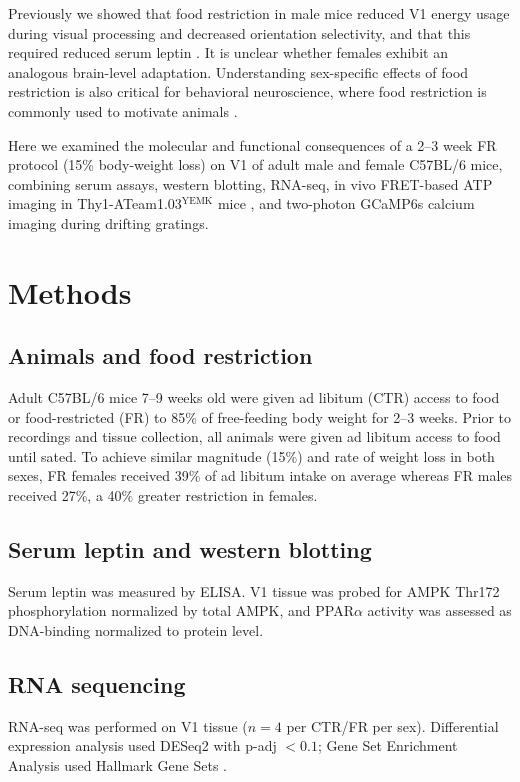 \documentclass[11pt]{article}
\begin{document}
Previously we showed that food restriction in male mice reduced V1 energy usage during visual processing and decreased orientation selectivity, and that this required reduced serum leptin \cite{padamsey2022neocortex}. It is unclear whether females exhibit an analogous brain-level adaptation. Understanding sex-specific effects of food restriction is also critical for behavioral neuroscience, where food restriction is commonly used to motivate animals \cite{hori1990comparative,toth2000animal,guo2014procedures}.

Here we examined the molecular and functional consequences of a 2--3 week FR protocol (15\% body-weight loss) on V1 of adult male and female C57BL/6 mice, combining serum assays, western blotting, RNA-seq, in vivo FRET-based ATP imaging in Thy1-ATeam1.03$^{\mathrm{YEMK}}$ mice \cite{imamura2009visualization,yoshida2019development}, and two-photon GCaMP6s calcium imaging during drifting gratings.

\section{Methods}
\subsection{Animals and food restriction}
Adult C57BL/6 mice 7--9 weeks old were given ad libitum (CTR) access to food or food-restricted (FR) to 85\% of free-feeding body weight for 2--3 weeks. Prior to recordings and tissue collection, all animals were given ad libitum access to food until sated. To achieve similar magnitude (15\%) and rate of weight loss in both sexes, FR females received 39\% of ad libitum intake on average whereas FR males received 27\%, a 40\% greater restriction in females.

\subsection{Serum leptin and western blotting}
Serum leptin was measured by ELISA. V1 tissue was probed for AMPK Thr172 phosphorylation normalized by total AMPK, and PPAR$\alpha$ activity was assessed as DNA-binding normalized to protein level.

\subsection{RNA sequencing}
RNA-seq was performed on V1 tissue ($n = 4$ per CTR/FR per sex). Differential expression analysis used DESeq2 \cite{love2014moderated} with p-adj $< 0.1$; Gene Set Enrichment Analysis used Hallmark Gene Sets \cite{subramanian2005gene,liberzon2015molecular}.
\end{document}
